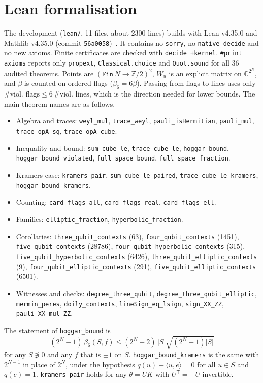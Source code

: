 \documentclass[aps,pra,onecolumn,11pt,superscriptaddress,nofootinbib]{revtex4-2}
\theoremstyle{definition}
\theoremstyle{remark}
\newcommand{\lean}[1]{\texttt{#1}}
\begin{document}
\section{Lean formalisation}\label{sec:lean}

The development (\texttt{lean/}, 11 files, about 2300 lines) builds with Lean v4.35.0 and
Mathlib v4.35.0 (commit \texttt{56a0058})~\cite{mathlib}. It contains no \texttt{sorry}, no
\texttt{native\_decide} and no new axioms. Finite certificates are checked with
\texttt{decide +kernel}. \texttt{\#print axioms} reports only
\texttt{propext}, \texttt{Classical.choice} and \texttt{Quot.sound} for all 36 audited
theorems. Points are $(\mathtt{Fin}\,N\to\mathbb Z/2)^2$, $W_u$ is an explicit matrix on
$\mathbb C^{2^N}$, and $\beta$ is counted on ordered flags ($\beta_6=6\beta$). Passing from flags
to lines uses only $\#\text{viol.\ flags}\le6\,\#\text{viol.\ lines}$, which is the direction
needed for lower bounds. The main theorem names are as follows.
\begin{itemize}
\item Algebra and traces: \lean{weyl\_mul}, \lean{trace\_weyl}, \lean{pauli\_isHermitian},
  \lean{pauli\_mul}, \lean{trace\_opA\_sq}, \lean{trace\_opA\_cube}.
\item Inequality and bound: \lean{sum\_cube\_le}, \lean{trace\_cube\_le}, \lean{hoggar\_bound},
  \lean{hoggar\_bound\_violated}, \lean{full\_space\_bound}, \lean{full\_space\_fraction}.
\item Kramers case: \lean{kramers\_pair}, \lean{sum\_cube\_le\_paired},
  \lean{trace\_cube\_le\_kramers}, \lean{hoggar\_bound\_kramers}.
\item Counting: \lean{card\_flags\_all}, \lean{card\_flags\_real}, \lean{card\_flags\_ell}.
\item Families: \lean{elliptic\_fraction}, \lean{hyperbolic\_fraction}.
\item Corollaries: \lean{three\_qubit\_contexts} (63), \lean{four\_qubit\_contexts} (1451),
  \lean{five\_qubit\_contexts} (28786), \lean{four\_qubit\_hyperbolic\_contexts} (315),
  \lean{five\_qubit\_hyperbolic\_contexts} (6426), \lean{three\_qubit\_elliptic\_contexts} (9),
  \lean{four\_qubit\_elliptic\_contexts} (291), \lean{five\_qubit\_elliptic\_contexts} (6501).
\item Witnesses and checks: \lean{degree\_three\_qubit}, \lean{degree\_three\_qubit\_elliptic},
  \lean{mermin\_peres}, \lean{doily\_contexts}, \lean{lineSign\_eq\_lsign},
  \lean{sign\_XX\_ZZ}, \lean{pauli\_XX\_mul\_ZZ}.
\end{itemize}
The statement of \lean{hoggar\_bound} is
\[
(2^N-1)\,\beta_6(S,f)\le(2^N-2)\,|S|\sqrt{(2^N-1)|S|}
\]
for any $S\not\ni0$ and any $f$ that is $\pm1$ on $S$. \lean{hoggar\_bound\_kramers} is the same with $2^{N-1}$ in place of
$2^N$, under the hypothesis $q(u)+\langle u,e\rangle=0$ for all $u\in S$ and $q(e)=1$.
\lean{kramers\_pair} holds for any $\theta=UK$ with $U^{\mathsf T}=-U$ invertible.
\end{document}
